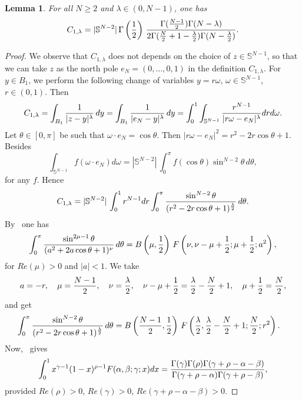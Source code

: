 \documentclass[10pt,reqno,english]{amsart}
\newtheorem{lemma}{Lemma}[section]
\theoremstyle{definition}
\numberwithin{equation}{section}
\begin{document}
\begin{lemma}
\label{lemmaC1}
For all $N\ge2$ and $\lambda\in(0,N-1)$, one has
\[
 C_{1,\lambda}= |\mathbb S^{N-2}| \, \Gamma \left( {1\over 2}\right) \, {\Gamma ({N-1\over 2}) \Gamma (N-\lambda) \over 2 \Gamma ({N\over 2} + 1-{\lambda \over 2}) \Gamma (N-{\lambda \over 2}) }.
 \]
\end{lemma}
\begin{proof}
We observe that $C_{1, \lambda}$ does not depends on the choice of $z\in\mathbb S^{N-1}$, so that we can take $z$ as the north pole $e_N=(0,\dots,0,1)$ in the definition $C_{1, \lambda}$. For $y \in B_1$, we perform the following change of variables $y=r \omega$, $\omega \in \mathbb S^{N-1}$, $r \in (0,1)$. Then
\[
C_{1,\lambda}=\int_{B_1}\frac{1}{|z-y|^\lambda}\,dy = \int_{B_1}\frac{1}{|e_N-y|^\lambda}\,dy = \int_0^1 \int_{\mathbb S^{N-1}} {r^{N-1} \over |r \omega - e_N|^\lambda } dr d \omega.
\]
Let $\theta \in [0,\pi]$ be such that $\omega \cdot e_N= \cos \theta$. Then $|r \omega - e_N|^2 = r^2 - 2 r \cos \theta +1$. Besides
\[
\int_{\mathbb S^{N-1}} f (\omega \cdot e_N) d \omega = |\mathbb S^{N-2}| \, \int_0^\pi f (\cos \theta ) \sin^{N-2} \theta \, d\theta,
\]
for any $f$.
Hence
\[
 C_{1, \lambda}= |\mathbb S^{N-2}| \, \int_0^1 r^{N-1} dr \int_0^\pi {\sin^{N-2} \theta \over (r^2 - 2r \cos \theta +1)^{\lambda \over 2}} \, d \theta.
\]
By~\cite[formula 3.665.2, page 409]{GRbook} one has
\[
 \int_0^\pi {\sin^{2\mu -1} \theta \over (a^2 + 2a \cos \theta +1)^{\nu}} \, d \theta = B\left(\mu , {1\over 2}\right) \, F\left(\nu , \nu- \mu +{1\over 2}; \mu+{1\over 2}; a^2\right),
\]
for $Re (\mu )>0$ and $|a|<1$.
We take 
\[
a=-r, \quad \mu={N-1 \over 2}, \quad \nu={\lambda \over 2}, \quad \nu- \mu +{1\over 2}= {\lambda \over 2} -{N \over 2} +1, \quad \mu+{1\over 2} = {N \over 2},
\]
and get 
\begin{align*}
    \int_0^\pi {\sin^{N-2} \theta \over (r^2 - 2r \cos \theta +1)^{\lambda \over 2}} \, d \theta&= 
    B\left( {N-1 \over 2}, {1\over 2}\right) \, F\left({\lambda \over 2} , {\lambda \over 2} -{N \over 2} +1 ; {N\over 2}; r^2\right).
\end{align*}
Now,~\cite[formula 7.512.4, page 821]{GRbook} gives
\begin{align*}
    \int_0^1 x^{\gamma -1} (1-x)^{\rho -1} F(\alpha, \beta; \gamma; x) dx ={\Gamma (\gamma) \Gamma (\rho) \Gamma (\gamma + \rho - \alpha - \beta) \over \Gamma (\gamma + \rho - \alpha ) \Gamma (\gamma + \rho - \beta)},
\end{align*}
provided $Re (\rho )>0$, $Re (\gamma) >0$, $Re (\gamma +\rho -\alpha - \beta) >0.$


\end{proof}
\end{document}

